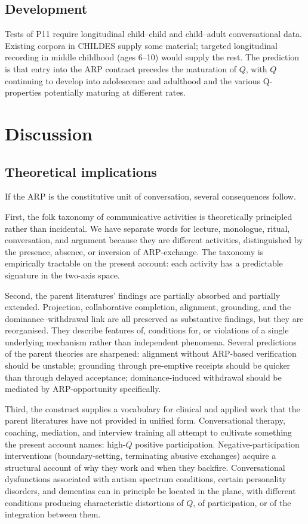 \subsection{Development}

Tests of P11 require longitudinal child--child and child--adult conversational data. Existing corpora in CHILDES supply some material; targeted longitudinal recording in middle childhood (ages 6--10) would supply the rest. The prediction is that entry into the ARP contract precedes the maturation of $Q$, with $Q$ continuing to develop into adolescence and adulthood and the various Q-properties potentially maturing at different rates.

\section{Discussion}\label{sec:discussion}

\subsection{Theoretical implications}

If the ARP is the constitutive unit of conversation, several consequences follow.

First, the folk taxonomy of communicative activities is theoretically principled rather than incidental. We have separate words for lecture, monologue, ritual, conversation, and argument because they are different activities, distinguished by the presence, absence, or inversion of ARP-exchange. The taxonomy is empirically tractable on the present account: each activity has a predictable signature in the two-axis space.

Second, the parent literatures' findings are partially absorbed and partially extended. Projection, collaborative completion, alignment, grounding, and the dominance--withdrawal link are all preserved as substantive findings, but they are reorganised. They describe features of, conditions for, or violations of a single underlying mechanism rather than independent phenomena. Several predictions of the parent theories are sharpened: alignment without ARP-based verification should be unstable; grounding through pre-emptive receipts should be quicker than through delayed acceptance; dominance-induced withdrawal should be mediated by ARP-opportunity specifically.

Third, the construct supplies a vocabulary for clinical and applied work that the parent literatures have not provided in unified form. Conversational therapy, coaching, mediation, and interview training all attempt to cultivate something the present account names: high-$Q$ positive participation. Negative-participation interventions (boundary-setting, terminating abusive exchanges) acquire a structural account of why they work and when they backfire. Conversational dysfunctions associated with autism spectrum conditions, certain personality disorders, and dementias can in principle be located in the plane, with different conditions producing characteristic distortions of $Q$, of participation, or of the integration between them.

